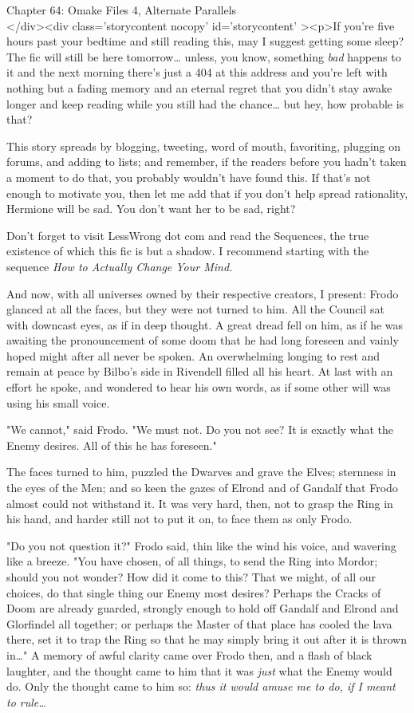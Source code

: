 
Chapter 64: Omake Files 4, Alternate Parallels\\
</div><div  class='storycontent nocopy' id='storycontent' ><p>If you're five 
hours past your bedtime and still reading this, may I suggest getting some 
sleep? The fic will still be here tomorrow{\ldots} unless, you know, something 
\emph{bad} happens to it and the next morning there's just a 404 at this 
address and you're left with nothing but a fading memory and an eternal regret 
that you didn't stay awake longer and keep reading while you still had the 
chance{\ldots} but hey, how probable is that?

This story spreads by blogging, tweeting, word of mouth, favoriting, plugging 
on forums, and adding to lists; and remember, if the readers before you hadn't 
taken a moment to do that, you probably wouldn't have found this. If that's not 
enough to motivate you, then let me add that if you don't help spread 
rationality, Hermione will be sad. You don't want her to be sad, right?

Don't forget to visit LessWrong dot com and read the Sequences, the true 
existence of which this fic is but a shadow. I recommend starting with the 
sequence \emph{How to Actually Change Your Mind.}

And now, with all universes owned by their respective creators, I present:
\sbreak
Frodo glanced at all the faces, but they were not turned to him. All the 
Council sat with downcast eyes, as if in deep thought. A great dread fell on 
him, as if he was awaiting the pronouncement of some doom that he had long 
foreseen and vainly hoped might after all never be spoken. An overwhelming 
longing to rest and remain at peace by Bilbo's side in Rivendell filled all his 
heart. At last with an effort he spoke, and wondered to hear his own words, as 
if some other will was using his small voice.

"We cannot," said Frodo. "We must not. Do you not see? It is exactly what the 
Enemy desires. All of this he has foreseen."

The faces turned to him, puzzled the Dwarves and grave the Elves; sternness in 
the eyes of the Men; and so keen the gazes of Elrond and of Gandalf that Frodo 
almost could not withstand it. It was very hard, then, not to grasp the Ring in 
his hand, and harder still not to put it on, to face them as only Frodo.

"Do you not question it?" Frodo said, thin like the wind his voice, and 
wavering like a breeze. "You have chosen, of all things, to send the Ring into 
Mordor; should you not wonder? How did it come to this? That we might, of all 
our choices, do that single thing our Enemy most desires? Perhaps the Cracks of 
Doom are already guarded, strongly enough to hold off Gandalf and Elrond and 
Glorfindel all together; or perhaps the Master of that place has cooled the 
lava there, set it to trap the Ring so that he may simply bring it out after it 
is thrown in{\ldots}" A memory of awful clarity came over Frodo then, and a 
flash of black laughter, and the thought came to him that it was \emph{just} 
what the Enemy would do. Only the thought came to him so: \emph{thus it would 
amuse me to do, if I meant to rule{\ldots}}

